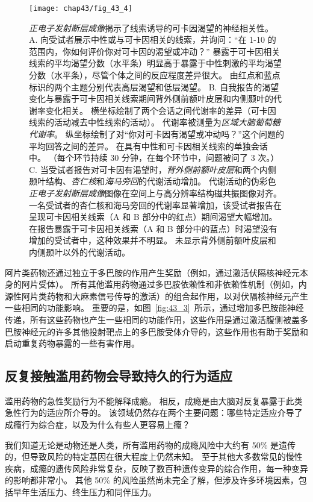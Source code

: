 \begin{figure}[htbp]
	\centering
	\texttt{[image: chap43/fig\_43\_4]}
	\caption{\textit{正电子发射断层成像}揭示了线索诱导的可卡因渴望的神经相关性\cite{grant1996activation}。
		A. 向受试者展示中性或与可卡因相关的线索，并询问：“在 1-10 的范围内，你如何评价你对可卡因的渴望或冲动？” 
		暴露于可卡因相关线索的平均渴望分数（水平条）明显高于暴露于中性刺激的平均渴望分数（水平条），尽管个体之间的反应程度差异很大。
		由红点和蓝点标识的两个主题分别代表高层渴望和低层渴望。
		B. 自我报告的渴望变化与暴露于可卡因相关线索期间背外侧前额叶皮层和内侧颞叶的代谢率变化相关。
		横坐标绘制了两个会话之间代谢率的差异（可卡因线索的活动减去中性线索的活动）。
		代谢率被测量为\textit{区域大脑葡萄糖代谢率}。
		纵坐标绘制了对“你对可卡因有渴望或冲动吗？”这个问题的平均回答之间的差异。
		在具有中性和可卡因相关线索的单独会话中。
		（每个环节持续 30 分钟，在每个环节中，问题被问了 3 次。）
		C. 当受试者报告对可卡因有渴望时，\textit{背外侧前额叶皮层}和两个内侧颞叶结构、\textit{杏仁核}和\textit{海马旁回}的代谢活动增加。
		代谢活动的伪彩色\textit{正电子发射断层成像}图像在空间上与高分辨率结构磁共振图像对齐。
		一名受试者的杏仁核和海马旁回的代谢率显著增加，该受试者报告在呈现可卡因相关线索（A 和 B 部分中的红点）期间渴望大幅增加。
		在报告暴露于可卡因相关线索（A 和 B 部分中的蓝点）时渴望没有增加的受试者中，这种效果并不明显。
		未显示背外侧前额叶皮层和内侧颞叶以外的代谢活动。}
	\label{fig:43_4}
\end{figure}


阿片类药物还通过独立于多巴胺的作用产生奖励（例如，通过激活伏隔核神经元本身的阿片受体）。
所有其他滥用药物通过多巴胺依赖性和非依赖性机制（例如，内源性阿片类药物和大麻素信号传导的激活）的组合起作用，以对伏隔核神经元产生一些相同的功能影响。
重要的是，如图~\ref{fig:43_3}~所示，通过增加多巴胺能神经传递，所有这些药物也产生一些相同的功能作用，这些作用是通过激活腹侧被盖多巴胺神经元的许多其他投射靶点上的多巴胺受体介导的，这些作用也有助于奖励和启动重复药物暴露的一些有害作用。



\subsection{反复接触滥用药物会导致持久的行为适应}

滥用药物的急性奖励行为不能解释成瘾。
相反，成瘾是由大脑对反复暴露于此类急性行为的适应所介导的。
该领域仍然存在两个主要问题：哪些特定适应介导了成瘾行为综合症，以及为什么有些人更容易上瘾？


我们知道无论是动物还是人类，所有滥用药物的成瘾风险中大约有 50\% 是遗传的，但导致风险的特定基因在很大程度上仍然未知。
至于其他大多数常见的慢性疾病，成瘾的遗传风险非常复杂，反映了数百种遗传变异的综合作用，每一种变异的影响都非常小。
其他 50\% 的风险虽然尚未完全了解，但涉及许多环境因素，包括早年生活压力、终生压力和同伴压力。


